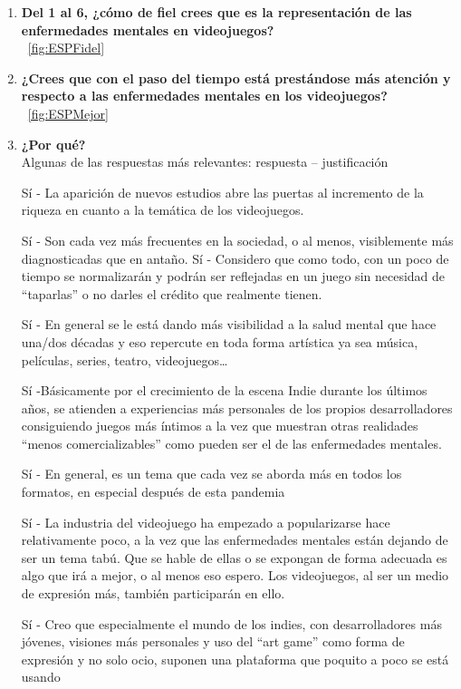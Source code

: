 \documentclass[12pt, a4paper,twoside,titlepage]{book}
\begin{document}
\begin{enumerate}[label=\textbf{\arabic*}.]
    
     \item \textbf{Del 1 al 6, ¿cómo de fiel crees que es la representación de las enfermedades mentales en videojuegos?}\\
    ~\ref{fig:ESPFidel}
     \item \textbf{¿Crees que con el paso del tiempo está prestándose más atención y respecto a las enfermedades mentales en los videojuegos?}\\
    ~\ref{fig:ESPMejor}
     \item \textbf{¿Por qué? }\\
    \label{mejorCastellano}
    Algunas de las respuestas más relevantes: respuesta – justificación
        
        Sí - La aparición de nuevos estudios abre las puertas al incremento de la riqueza en cuanto a la temática de los videojuegos.
        
        Sí - Son cada vez más frecuentes en la sociedad, o al menos, visiblemente más diagnosticadas que en antaño.
        Sí - Considero que como todo, con un poco de tiempo se normalizarán y podrán ser reflejadas en un juego sin necesidad de ``taparlas'' o no darles el crédito que realmente tienen.
        
        Sí - En general se le está dando más visibilidad a la salud mental que hace una/dos décadas y eso repercute en toda forma artística ya sea música, películas, series, teatro, videojuegos…
        
        Sí -Básicamente por el crecimiento de la escena Indie durante los últimos años, se atienden a experiencias más personales de los propios desarrolladores consiguiendo juegos más íntimos a la vez que muestran otras realidades ``menos comercializables'' como pueden ser el de las enfermedades mentales.
        
        Sí - En general, es un tema que cada vez se aborda más en todos los formatos, en especial después de esta pandemia
        
        Sí - La industria del videojuego ha empezado a popularizarse hace relativamente poco, a la vez que las enfermedades mentales están dejando de ser un tema tabú. Que se hable de ellas o se expongan de forma adecuada es algo que irá a mejor, o al menos eso espero. Los videojuegos, al ser un medio de expresión más, también participarán en ello.
        
        Sí -	Creo que especialmente el mundo de los indies, con desarrolladores más jóvenes, visiones más personales y uso del ``art game'' como forma de expresión y no solo ocio, suponen una plataforma que poquito a poco se está usando
        

\end{enumerate}
\end{document}
